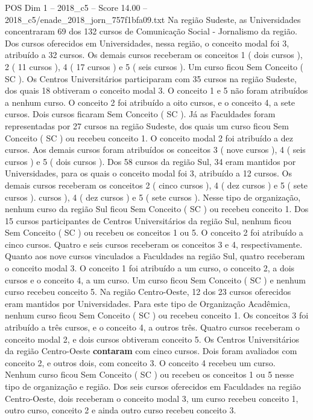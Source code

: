 \begin{textsample}{POS Dim 1 – 2018\_c5 – Score 14.00 – 2018\_c5/enade\_2018\_jorn\_757f1bfa09.txt}
Na região Sudeste, as Universidades concentraram 69 dos 132 cursos de Comunicação Social - Jornalismo da região.
Dos cursos oferecidos em Universidades, nessa região, o conceito modal foi 3, atribuído a 32 cursos.
Os demais cursos receberam os conceitos 1 ( dois cursos ), 2 ( 11 cursos ), 4 ( 17 cursos ) e 5 ( seis cursos ).
Um curso ficou Sem Conceito ( SC ).
Os Centros Universitários participaram com 35 cursos na região Sudeste, dos quais 18 obtiveram o conceito modal 3.
O conceito 1 e 5 não foram atribuídos a nenhum curso.
O conceito 2 foi atribuído a oito cursos, e o conceito 4, a sete cursos.
Dois cursos ficaram Sem Conceito ( SC ).
Já as Faculdades foram representadas por 27 cursos na região Sudeste, dos quais um curso ficou Sem Conceito ( SC ) ou recebeu conceito 1.
O conceito modal 2 foi atribuído a dez cursos.
Aos demais cursos foram atribuídos os conceitos 3 ( nove cursos ), 4 ( seis cursos ) e 5 ( dois cursos ).
Dos 58 cursos da região Sul, 34 eram mantidos por Universidades, para os quais o conceito modal foi 3, atribuído a 12 cursos.
Os demais cursos receberam os conceitos 2 ( cinco cursos ), 4 ( dez cursos ) e 5 ( sete cursos ). cursos ), 4 ( dez cursos ) e 5 ( sete cursos ).
Nesse tipo de organização, nenhum curso da região Sul ficou Sem Conceito ( SC ) ou recebeu conceito 1.
Dos 15 cursos participantes de Centros Universitários da região Sul, nenhum ficou Sem Conceito ( SC ) ou recebeu os conceitos 1 ou 5.
O conceito 2 foi atribuído a cinco cursos.
Quatro e seis cursos receberam os conceitos 3 e 4, respectivamente.
Quanto aos nove cursos vinculados a Faculdades na região Sul, quatro receberam o conceito modal 3.
O conceito 1 foi atribuído a um curso, o conceito 2, a dois cursos e o conceito 4, a um curso.
Um curso ficou Sem Conceito ( SC ) e nenhum curso recebeu conceito 5.
Na região Centro-Oeste, 12 dos 23 cursos oferecidos eram mantidos por Universidades.
Para este tipo de Organização Acadêmica, nenhum curso ficou Sem Conceito ( SC ) ou recebeu conceito 1.
Os conceitos 3 foi atribuído a três cursos, e o conceito 4, a outros três.
Quatro cursos receberam o conceito modal 2, e dois cursos obtiveram conceito 5.
Os Centros Universitários da região Centro-Oeste \textbf{contaram} com cinco cursos.
Dois foram avaliados com conceito 2, e outros dois, com conceito 3.
O conceito 4 recebeu um curso.
Nenhum curso ficou Sem Conceito ( SC ) ou recebeu os conceitos 1 ou 5 nesse tipo de organização e região.
Dos seis cursos oferecidos em Faculdades na região Centro-Oeste, dois receberam o conceito modal 3, um curso recebeu conceito 1, outro curso, conceito 2 e ainda outro curso recebeu conceito 3.

\end{textsample}
